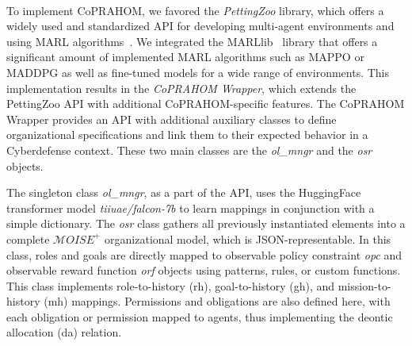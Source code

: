 
\

To implement CoPRAHOM, we favored the \emph{PettingZoo} library, which offers a widely used and standardized API for developing multi-agent environments and using MARL algorithms~\cite{terry2020pettingzoo}. We integrated the MARLlib~\cite{hu2022marllib} library that offers a significant amount of implemented MARL algorithms such as MAPPO or MADDPG as well as fine-tuned models for a wide range of environments. This implementation results in the \textit{CoPRAHOM Wrapper}, which extends the PettingZoo API with additional CoPRAHOM-specific features.
%
The CoPRAHOM Wrapper provides an API with additional auxiliary classes to define organizational specifications and link them to their expected behavior in a Cyberdefense context. These two main classes are the \textit{ol\_mngr} and the \textit{osr} objects.

The singleton class \textit{ol\_mngr}, as a part of the API, uses the HuggingFace transformer model \textit{tiiuae/falcon-7b} to learn mappings in conjunction with a simple dictionary.
The \textit{osr} class gathers all previously instantiated elements into a complete $\mathcal{M}OISE^+$ organizational model, which is JSON-representable. In this class, roles and goals are directly mapped to observable policy constraint \textit{opc} and observable reward function \textit{orf} objects using patterns, rules, or custom functions. This class implements role-to-history (rh), goal-to-history (gh), and mission-to-history (mh) mappings. Permissions and obligations are also defined here, with each obligation or permission mapped to agents, thus implementing the deontic allocation (da) relation.

